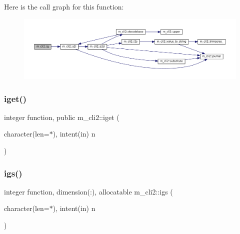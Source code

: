 Here is the call graph for this function\+:\nopagebreak
\begin{figure}[H]
\begin{center}
\leavevmode
\includegraphics[width=350pt]{namespacem__cli2_a11c3cc864e613c90b2a02c7409c00828_cgraph}
\end{center}
\end{figure}
\mbox{\label{namespacem__cli2_a1b41630a5b78ed0fcb6b6df49ac7738d}} 
\subsubsection{\texorpdfstring{iget()}{iget()}}
{\footnotesize\ttfamily integer function, public m\+\_\+cli2\+::iget (\begin{DoxyParamCaption}\item[{character(len=$\ast$), intent(in)}]{n }\end{DoxyParamCaption})}

\mbox{\label{namespacem__cli2_a39e18c9b881ea554d6d0adee0f5a5313}} 
\subsubsection{\texorpdfstring{igs()}{igs()}}
{\footnotesize\ttfamily integer function, dimension(\+:), allocatable m\+\_\+cli2\+::igs (\begin{DoxyParamCaption}\item[{character(len=$\ast$), intent(in)}]{n }\end{DoxyParamCaption})\hspace{0.3cm}{\ttfamily [private]}}

\mbox{\label{namespacem__cli2_ab3f2aa827b3b7ff419bcdc3ccb2672b3}} 
